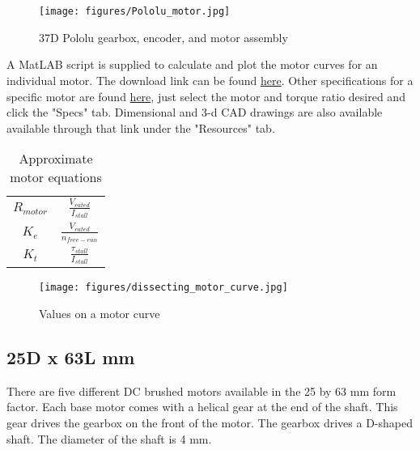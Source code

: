 \documentclass[12pt, onecolumn]{article}
\begin{document}
\\
\\

\begin{figure}[h!]
    \centering
    \texttt{[image: figures/Pololu\_motor.jpg]}
    \caption{37D Pololu gearbox, encoder, and motor assembly}
    \label{fig:pololu}
\end{figure}


A MatLAB script is supplied to calculate and plot the motor curves for an individual motor. The download link can be found \href{https://www.mathworks.com/matlabcentral/fileexchange/54695-polulu-motor-plot-generator}{here}. Other specifications for a specific motor are found \href{https://www.pololu.com/category/51/pololu-metal-gearmotors}{here}, just select the motor and torque ratio desired and click the "Specs" tab. Dimensional and 3-d CAD drawings are also available available through that link under the "Resources" tab.

\begin{table}[h!]
    \centering
    \begin{tabular}{|c|c|}
    \hline
        $R_{motor}$ & $\frac{V_{rated}}{I_{stall}}$ \\ [8pt]
        $K_e$ & $\frac{V_{rated}}{n_{free-run}}$\\ [8pt]
        $K_t$ & $\frac{\tau_{stall}}{I_{stall}}$ \\ [8pt]
        \hline
    \end{tabular}
    \caption{Approximate motor equations}
    \label{tab:approx motor vals}
\end{table}

\begin{figure}[h!]
    \centering
    \texttt{[image: figures/dissecting\_motor\_curve.jpg]}
    \caption{Values on a motor curve}
    \label{fig:motor curve}
\end{figure}



\subsection{25D x 63L mm}
There are five different DC brushed motors available in the 25 by 63 mm form factor. Each base motor comes with a helical gear at the end of the shaft. This gear drives the gearbox on the front of the motor. The gearbox drives a D-shaped shaft. The diameter of the shaft is 4 mm. 
\\
\\
\end{document}
